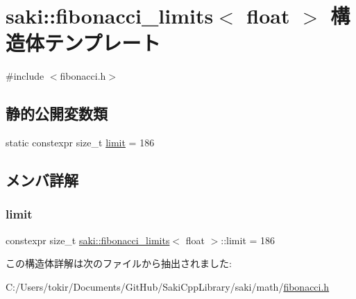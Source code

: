 \hypertarget{structsaki_1_1fibonacci__limits_3_01float_01_4}{}\section{saki\+:\+:fibonacci\+\_\+limits$<$ float $>$ 構造体テンプレート}
\label{structsaki_1_1fibonacci__limits_3_01float_01_4}


{\ttfamily \#include $<$fibonacci.\+h$>$}

\subsection*{静的公開変数類}
\begin{DoxyCompactItemize}
\item 
static constexpr size\+\_\+t \mbox{\hyperlink{structsaki_1_1fibonacci__limits_3_01float_01_4_a973ff4cf0e32a3051888989d25498b76}{limit}} = 186
\end{DoxyCompactItemize}


\subsection{メンバ詳解}
\mbox{\label{structsaki_1_1fibonacci__limits_3_01float_01_4_a973ff4cf0e32a3051888989d25498b76}} 
\subsubsection{\texorpdfstring{limit}{limit}}
{\footnotesize\ttfamily constexpr size\+\_\+t \mbox{\hyperlink{structsaki_1_1fibonacci__limits}{saki\+::fibonacci\+\_\+limits}}$<$ float $>$\+::limit = 186\hspace{0.3cm}{\ttfamily [static]}}



この構造体詳解は次のファイルから抽出されました\+:\begin{DoxyCompactItemize}
\item 
C\+:/\+Users/tokir/\+Documents/\+Git\+Hub/\+Saki\+Cpp\+Library/saki/math/\mbox{\hyperlink{fibonacci_8h}{fibonacci.\+h}}\end{DoxyCompactItemize}
